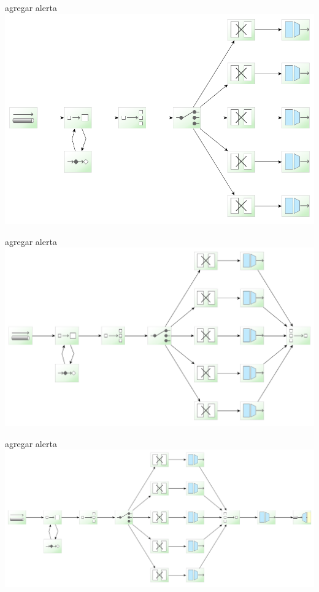 \documentclass{beamer}
\begin{document}
\begin{frame}{agregar alerta}
\includegraphics[width=0.9\linewidth]{sp-int-28}
\end{frame}

\begin{frame}{agregar alerta}
\includegraphics[width=1.0\linewidth]{sp-int-29}
\end{frame}

\begin{frame}{agregar alerta}
\includegraphics[width=1.1\linewidth]{sp-int-30}
\end{frame}
\end{document}
